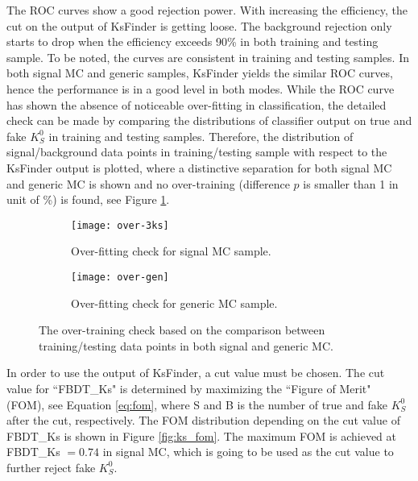 The ROC curves show a good rejection power. With increasing the efficiency, the cut on the output of KsFinder is getting loose. The background rejection only starts to drop when the efficiency exceeds 90\% in both training and testing sample. To be noted, the curves are consistent in training and testing samples. In both signal MC and generic samples, KsFinder yields the similar ROC curves, hence the performance is in a good level in both modes.
While the ROC curve has shown the absence of noticeable over-fitting in classification, the detailed check can be made by comparing the distributions of classifier output on true and fake $K_S^0$ in training and testing samples. Therefore, the distribution of signal/background data points in training/testing sample with respect to the KsFinder output is plotted, where a distinctive separation for both signal MC and generic MC is shown and no over-training (difference $p$ is smaller than 1 in unit of \%) is found, see Figure \ref{fig:ks_overtraining}.
\begin{figure}[H]
	\begin{subfigure}{1\linewidth}
		\centering
		\texttt{[image: over-3ks]}
		\caption{Over-fitting check for signal MC sample.}
	\end{subfigure}
  	\vspace{0.3cm}

	\begin{subfigure}{1\linewidth}
		\centering
		\texttt{[image: over-gen]}
		\caption{Over-fitting check for generic MC sample.}
	\end{subfigure}
\caption{The over-training check based on the comparison between training/testing data points in both signal and generic MC.}
\label{fig:ks_overtraining}
	\vspace{0.3cm}
	
\end{figure}

In order to use the output of KsFinder, a cut value must be chosen. The cut value for ``FBDT\_Ks" is determined by maximizing the ``Figure of Merit" (FOM), see Equation \ref{eq:fom}, where S and B is the number of true and fake $K_S^0$ after the cut, respectively. The FOM distribution depending on the cut value of FBDT\_Ks is shown in Figure \ref{fig:ks_fom}. The maximum FOM is achieved at FBDT\_Ks $= 0.74$ in signal MC, which is going to be used as the cut value to further reject fake $K_S^0$.

